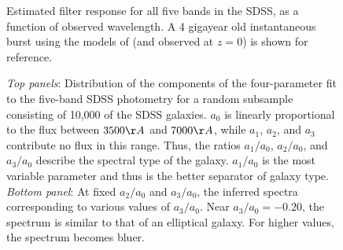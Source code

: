\clearpage

\setcounter{thefigs}{0}

\clearpage
{}
\begin{figure}
\figurenum{\fignum}
\caption{\label{response_sdss} Estimated filter response for all five
bands in the SDSS, as a function of observed wavelength. A 4 gigayear
old instantaneous burst using the models of \citet{bruzual93a} (and
observed at $z=0$) is shown for reference.}
\end{figure}


\clearpage
{}
\begin{figure}
\figurenum{\fignum}
\caption{\label{k_coeffdist_plot} {\it Top panels}: Distribution of
the components of the four-parameter fit to the five-band SDSS
photometry for a random subsample consisting of 10,000 of the SDSS
galaxies. $a_0$ is linearly proportional to the flux between $3500\AA$
and $7000\AA$, while $a_1$, $a_2$, and $a_3$ contribute no flux in
this range. Thus, the ratios $a_1/a_0$, $a_2/a_0$, and $a_3/a_0$
describe the spectral type of the galaxy. $a_1/a_0$ is the most
variable parameter and thus is the better separator of galaxy
type. {\it Bottom panel}: At fixed $a_2/a_0$ and $a_3/a_0$, the
inferred spectra corresponding to various values of $a_3/a_0$. Near
$a_3/a_0=-0.20$, the spectrum is similar to that of an elliptical
galaxy. For higher values, the spectrum becomes bluer. }
\end{figure}

